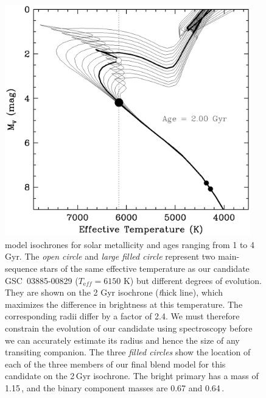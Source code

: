 \begin{figure}
\begin{center}
\includegraphics[width=0.95\textwidth]{3_f2}
\caption[Location of blend model components on isochrones]{\citet{Girardi_Bressan_Bertelli:aas:2000a} model isochrones
  for solar metallicity and ages ranging from 1 to 4 Gyr.
  The \textit{open circle} and \textit{large filled circle} represent two main-sequence stars of the same effective temperature as our candidate
  \mbox{GSC 03885-00829} ($T_{\mathrm eff} = 6150$ K) but different
  degrees of evolution. They are shown on the 2 Gyr isochrone ({\textit thick
  line}), which maximizes the difference in brightness at this
  temperature. The corresponding radii differ by a factor of 2.4. We
  must therefore constrain the evolution of our candidate using
  spectroscopy before we can accurately estimate its radius and hence
  the size of any transiting companion. The three \textit{filled circles} show
  the location of each of the three members of our final blend model
  for this candidate on the 2\,Gyr isochrone. The bright primary has a
  mass of 1.15\,\msun, and the binary component masses are
  0.67 and 0.64\,\msun.}\label{cha:gsc:fig:isochrones}
\end{center}
\end{figure}

